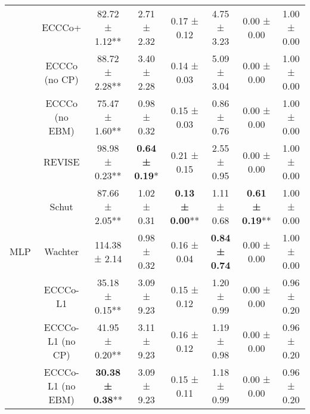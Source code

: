 \begin{table}
{\begin{tabular}[t]{cccccccc}
 & ECCCo+ & 82.72 ± 1.12** & 2.71 ± 2.32\hphantom{*}\hphantom{*} & 0.17 ± 0.12\hphantom{*}\hphantom{*} & 4.75 ± 3.23\hphantom{*}\hphantom{*} & 0.00 ± 0.00\hphantom{*}\hphantom{*} & 1.00 ± 0.00\hphantom{*}\hphantom{*}\\

 & ECCCo (no CP) & 88.72 ± 2.28** & 3.40 ± 2.28\hphantom{*}\hphantom{*} & 0.14 ± 0.03\hphantom{*}\hphantom{*} & 5.09 ± 3.04\hphantom{*}\hphantom{*} & 0.00 ± 0.00\hphantom{*}\hphantom{*} & 1.00 ± 0.00\hphantom{*}\hphantom{*}\\

 & ECCCo (no EBM) & 75.47 ± 1.60** & 0.98 ± 0.32\hphantom{*}\hphantom{*} & 0.15 ± 0.03\hphantom{*}\hphantom{*} & 0.86 ± 0.76\hphantom{*}\hphantom{*} & 0.00 ± 0.00\hphantom{*}\hphantom{*} & 1.00 ± 0.00\hphantom{*}\hphantom{*}\\

 & REVISE & 98.98 ± 0.23** & \textbf{0.64 ± 0.19}*\hphantom{*} & 0.21 ± 0.15\hphantom{*}\hphantom{*} & 2.55 ± 0.95\hphantom{*}\hphantom{*} & 0.00 ± 0.00\hphantom{*}\hphantom{*} & 1.00 ± 0.00\hphantom{*}\hphantom{*}\\

 & Schut & 87.66 ± 2.05** & 1.02 ± 0.31\hphantom{*}\hphantom{*} & \textbf{0.13 ± 0.00}** & 1.11 ± 0.68\hphantom{*}\hphantom{*} & \textbf{0.61 ± 0.19}** & 1.00 ± 0.00\hphantom{*}\hphantom{*}\\

\multirow[t]{-10}{*}{\centering\arraybackslash MLP} & Wachter & 114.38 ± 2.14\hphantom{*}\hphantom{*} & 0.98 ± 0.32\hphantom{*}\hphantom{*} & 0.16 ± 0.04\hphantom{*}\hphantom{*} & \textbf{0.84 ± 0.74}\hphantom{*}\hphantom{*} & 0.00 ± 0.00\hphantom{*}\hphantom{*} & 1.00 ± 0.00\hphantom{*}\hphantom{*}\\
\cmidrule{1-8}
 & ECCCo-L1 & 35.18 ± 0.15** & 3.09 ± 9.23\hphantom{*}\hphantom{*} & 0.15 ± 0.12\hphantom{*}\hphantom{*} & 1.20 ± 0.99\hphantom{*}\hphantom{*} & 0.00 ± 0.00\hphantom{*}\hphantom{*} & 0.96 ± 0.20\hphantom{*}\hphantom{*}\\

 & ECCCo-L1 (no CP) & 41.95 ± 0.20** & 3.11 ± 9.23\hphantom{*}\hphantom{*} & 0.16 ± 0.12\hphantom{*}\hphantom{*} & 1.19 ± 0.98\hphantom{*}\hphantom{*} & 0.00 ± 0.00\hphantom{*}\hphantom{*} & 0.96 ± 0.20\hphantom{*}\hphantom{*}\\

 & ECCCo-L1 (no EBM) & \textbf{30.38 ± 0.38}** & 3.09 ± 9.23\hphantom{*}\hphantom{*} & 0.15 ± 0.11\hphantom{*}\hphantom{*} & 1.18 ± 0.99\hphantom{*}\hphantom{*} & 0.00 ± 0.00\hphantom{*}\hphantom{*} & 0.96 ± 0.20\hphantom{*}\hphantom{*}\\


\end{tabular}}
\end{table}
